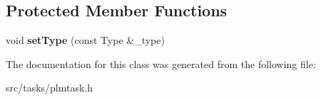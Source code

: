 \subsection*{Protected Member Functions}
\begin{DoxyCompactItemize}
\item 
void {\bfseries set\+Type} (const Type \&\+\_\+type)\hypertarget{class_p_l_m_task_a51fa5c4fd2dbffc2df4506b55107b0a7}{}\label{class_p_l_m_task_a51fa5c4fd2dbffc2df4506b55107b0a7}

\end{DoxyCompactItemize}


The documentation for this class was generated from the following file\+:\begin{DoxyCompactItemize}
\item 
src/tasks/plmtask.\+h\end{DoxyCompactItemize}
